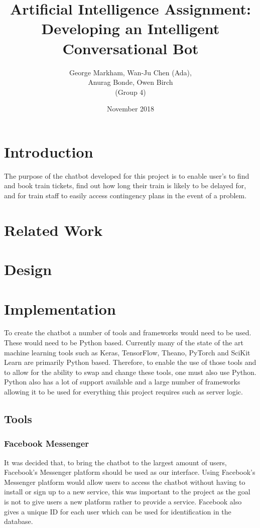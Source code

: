 \documentclass[12pt,a4paper]{article}
\title{Artificial Intelligence Assignment: Developing an Intelligent Conversational Bot}
\author{George Markham, Wan-Ju Chen (Ada), \\ Anurag Bonde, Owen Birch \\ (Group 4)} %
\date{November 2018}
\begin{document}
    \maketitle
    \section*{Introduction}
    The purpose of the chatbot developed for this project is to enable user's to find and book train tickets, find out how long their train is likely to be delayed for, and for train staff to easily access contingency plans in the event of a problem.
    \section*{Related Work}
    \section*{Design}
    
    \section*{Implementation}
    
    To create the chatbot a number of tools and frameworks would need to be used. These would need to be Python based. Currently many of the state of the art machine learning tools such as Keras, TensorFlow, Theano, PyTorch and SciKit Learn are primarily Python based. Therefore, to enable the use of those tools and to allow for the ability to swap and change these tools, one must also use Python. Python also has a lot of support available and a large number of frameworks allowing it to be used for everything this project requires such as server logic.
    
    \subsection*{Tools}
    \subsubsection*{Facebook Messenger}
    It was decided that, to bring the chatbot to the largest amount of users, Facebook's Messenger platform should be used as our interface. Using Facebook's Messenger platform would allow users to access the chatbot without having to install or sign up to a new service, this was important to the project as the goal is not to give users a new platform rather to provide a service. Facebook also gives a unique ID for each user which can be used for identification in the database.
\end{document}
